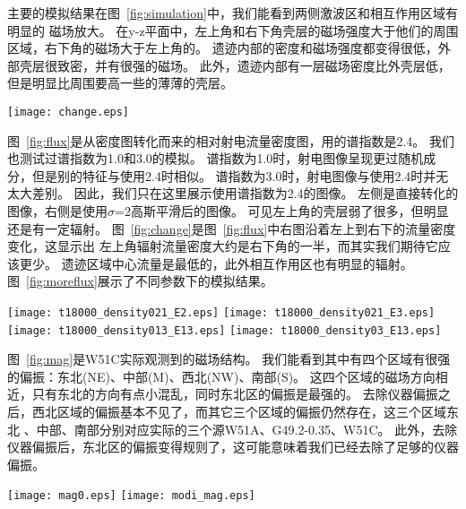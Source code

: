 主要的模拟结果在图~\ref{fig:simulation}中，我们能看到两侧激波区和相互作用区域有明显的
磁场放大。
在y-z平面中，左上角和右下角壳层的磁场强度大于他们的周围区域，右下角的磁场大于左上角的。
遗迹内部的密度和磁场强度都变得很低，外部壳层很致密，并有很强的磁场。
此外，遗迹内部有一层磁场密度比外壳层低，但是明显比周围要高一些的薄薄的壳层。

\begin{figure*}
    \centering
    \texttt{[image: change.eps]}
    \caption{这是图~\ref{fig:flux}的右图中左上到右下的流量切线图。 }
\label{fig:change}
\end{figure*}

图~\ref{fig:flux}是从密度图转化而来的相对射电流量密度图，用的谱指数是2.4。
我们也测试过谱指数为1.0和3.0的模拟。
谱指数为1.0时，射电图像呈现更过随机成分，但是别的特征与使用2.4时相似。
谱指数为3.0时，射电图像与使用2.4时并无太大差别。
因此，我们只在这里展示使用谱指数为2.4的图像。
左侧是直接转化的图像，右侧是使用$\sigma$=2高斯平滑后的图像。
可见左上角的壳层弱了很多，但明显还是有一定辐射。
图~\ref{fig:change}是图~\ref{fig:flux}中右图沿着左上到右下的流量密度变化，这显示出
左上角辐射流量密度大约是右下角的一半，而其实我们期待它应该更少。
遗迹区域中心流量是最低的，此外相互作用区也有明显的辐射。
图~\ref{fig:moreflux}展示了不同参数下的模拟结果。

\begin{figure*}
    \centering
    \texttt{[image: t18000\_density021\_E2.eps]}
    \texttt{[image: t18000\_density021\_E3.eps]}\newline
    \texttt{[image: t18000\_density013\_E13.eps]}
    \texttt{[image: t18000\_density03\_E13.eps]}
    \caption{这是$\sigma$=2时不同参数下的相对射电流量密度图。 顶部两幅图为将初始爆发动能改为
    2.0和3.0 $\times$ 10$^{51}$ ergs的结果, 下面两幅图为将平均介质密度改为
    0.13 cm$^{-3}$和0.3 cm$^{-3}$的结果。}
\label{fig:moreflux}
\end{figure*}

图~\ref{fig:mag}是W51C实际观测到的磁场结构。
我们能看到其中有四个区域有很强的偏振：东北(NE)、中部(M)、西北(NW)、南部(S)。
这四个区域的磁场方向相近，只有东北的方向有点小混乱，同时东北区的偏振是最强的。
去除仪器偏振之后，西北区域的偏振基本不见了，而其它三个区域的偏振仍然存在，这三个区域东北
、中部、南部分别对应实际的三个源W51A、G49.2-0.35、W51C。
此外，去除仪器偏振后，东北区的偏振变得规则了，这可能意味着我们已经去除了足够的仪器偏振。

\begin{figure*}
   \centering
   \texttt{[image: mag0.eps]}
   \texttt{[image: modi\_mag.eps]}
   \caption{左图中彩色背景是来自VPGS的1.4 GHz连续谱图像。黑色的箭头代表没有扣仪器偏振的
   在2695 MHz的磁场方向，箭头长度代表偏振强度(mK)，其中最大的强度是1581 mK。
   下图中，彩色背景是扣除仪器偏振后的2695 MHz的偏振度，白色箭头代表磁场方向，箭头长度代表
   偏振度，其中最大的偏振度是$2\%$。}
\label{fig:mag}
\end{figure*}

